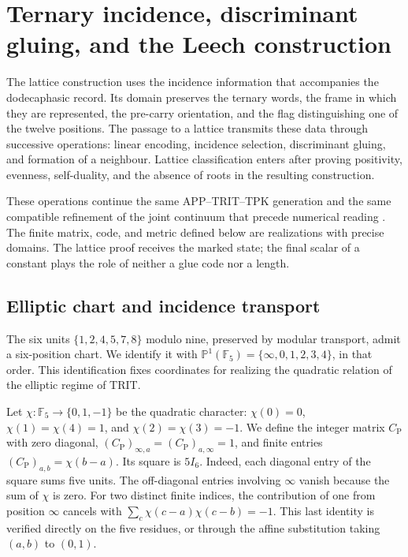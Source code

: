 \section{Ternary incidence, discriminant gluing, and the Leech construction}
\label{sec:lf-foundations}

The lattice construction uses the incidence information that
accompanies the dodecaphasic record. Its domain preserves the ternary
words, the frame in which they are represented, the pre-carry
orientation, and the flag distinguishing one of the twelve positions. The
passage to a lattice transmits these data through successive
operations: linear encoding, incidence selection, discriminant
gluing, and formation of a neighbour. Lattice classification
enters after proving positivity, evenness, self-duality,
and the absence of roots in the resulting construction.

These operations continue the same APP--TRIT--TPK
generation and the same compatible refinement of the joint
continuum that precede numerical reading \cite{HMT-IV}.
The finite matrix, code, and metric defined below
are realizations with precise domains. The lattice
proof receives the marked state; the final scalar of a
constant plays the role of neither a glue code nor a length.

\subsection{Elliptic chart and incidence transport}
\label{subsec:lf-incidence}

The six units \(\{1,2,4,5,7,8\}\) modulo nine, preserved
by modular transport, admit a six-position chart.
We identify it with
\(\mathbb P^1(\mathbb F_5)=\{\infty,0,1,2,3,4\}\), in that order.
This identification fixes coordinates for realizing the quadratic
relation of the elliptic regime of TRIT.

Let \(\chi:\mathbb F_5\to\{0,1,-1\}\) be the quadratic character:
\(\chi(0)=0\), \(\chi(1)=\chi(4)=1\), and
\(\chi(2)=\chi(3)=-1\). We define the integer matrix
\(C_{\mathrm P}\) with zero diagonal,
\((C_{\mathrm P})_{\infty,a}=(C_{\mathrm P})_{a,\infty}=1\),
and finite entries \((C_{\mathrm P})_{a,b}=\chi(b-a)\).
Its square is \(5I_6\). Indeed, each diagonal entry of the
square sums five units. The off-diagonal entries involving
\(\infty\) vanish because the sum of
\(\chi\) is zero. For two distinct finite indices, the
contribution of one from position \(\infty\) cancels with
\(\sum_c\chi(c-a)\chi(c-b)=-1\). This last identity is verified
directly on the five residues, or through the affine
substitution taking \((a,b)\) to \((0,1)\).


